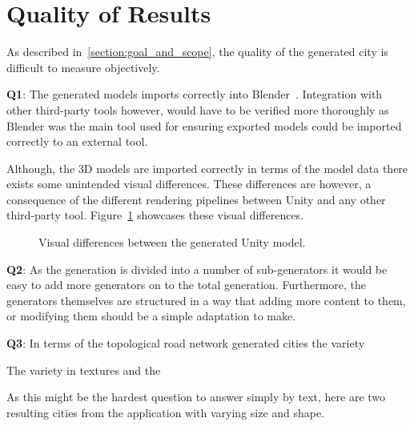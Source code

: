 \section{Quality of Results}

As described in~\ref{section:goal_and_scope}, the quality of the generated city is difficult to measure objectively.

\textbf{Q1}: \newline
The generated models imports correctly into Blender~\cite{blender}.
Integration with other third-party tools however, would have to be verified more thoroughly as Blender was the main tool used for ensuring exported models could be imported correctly to an external tool. 

Although, the 3D models are imported correctly in terms of the model data there exists some unintended visual differences.
These differences are however, a consequence of the different rendering pipelines between Unity and any other third-party tool.
Figure~\ref{fig:blender_shading_result} showcases these visual differences.

\begin{figure}[h!]
  \centering
  \caption{Visual differences between the generated Unity model.}
  \label{fig:blender_shading_result}
\end{figure}

\textbf{Q2}: \newline
As the generation is divided into a number of sub-generators it would be easy to add more generators on to the total generation.
Furthermore, the generators themselves are structured in a way that adding more content to them, or modifying them should be a simple adaptation to make. 

\textbf{Q3}: \newline
In terms of the topological road network generated cities the variety 

The variety in textures and the 

As this might be the hardest question to answer simply by text, here are two resulting cities from the application with varying size and shape.

